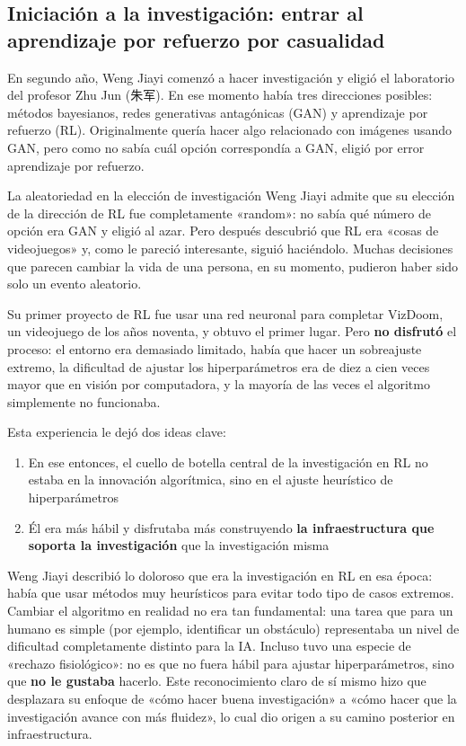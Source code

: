 \documentclass[a4paper]{article}
\begin{document}
\subsection{Iniciación a la investigación: entrar al aprendizaje por refuerzo por casualidad}

En segundo año, Weng Jiayi comenzó a hacer investigación y eligió el laboratorio del profesor Zhu Jun (朱军). En ese momento había tres direcciones posibles: métodos bayesianos, redes generativas antagónicas (GAN) y aprendizaje por refuerzo (RL). Originalmente quería hacer algo relacionado con imágenes usando GAN, pero como no sabía cuál opción correspondía a GAN, eligió por error aprendizaje por refuerzo.

\begin{warningbox}{La aleatoriedad en la elección de investigación}
Weng Jiayi admite que su elección de la dirección de RL fue completamente «random»: no sabía qué número de opción era GAN y eligió al azar. Pero después descubrió que RL era «cosas de videojuegos» y, como le pareció interesante, siguió haciéndolo. Muchas decisiones que parecen cambiar la vida de una persona, en su momento, pudieron haber sido solo un evento aleatorio.
\end{warningbox}

Su primer proyecto de RL fue usar una red neuronal para completar VizDoom, un videojuego de los años noventa, y obtuvo el primer lugar. Pero \textbf{no disfrutó} el proceso: el entorno era demasiado limitado, había que hacer un sobreajuste extremo, la dificultad de ajustar los hiperparámetros era de diez a cien veces mayor que en visión por computadora, y la mayoría de las veces el algoritmo simplemente no funcionaba.

Esta experiencia le dejó dos ideas clave:
\begin{enumerate}
    \item En ese entonces, el cuello de botella central de la investigación en RL no estaba en la innovación algorítmica, sino en el ajuste heurístico de hiperparámetros
    \item Él era más hábil y disfrutaba más construyendo \textbf{la infraestructura que soporta la investigación} que la investigación misma
\end{enumerate}

Weng Jiayi describió lo doloroso que era la investigación en RL en esa época: había que usar métodos muy heurísticos para evitar todo tipo de casos extremos. Cambiar el algoritmo en realidad no era tan fundamental: una tarea que para un humano es simple (por ejemplo, identificar un obstáculo) representaba un nivel de dificultad completamente distinto para la IA. Incluso tuvo una especie de «rechazo fisiológico»: no es que no fuera hábil para ajustar hiperparámetros, sino que \textbf{no le gustaba} hacerlo. Este reconocimiento claro de sí mismo hizo que desplazara su enfoque de «cómo hacer buena investigación» a «cómo hacer que la investigación avance con más fluidez», lo cual dio origen a su camino posterior en infraestructura.
\end{document}
